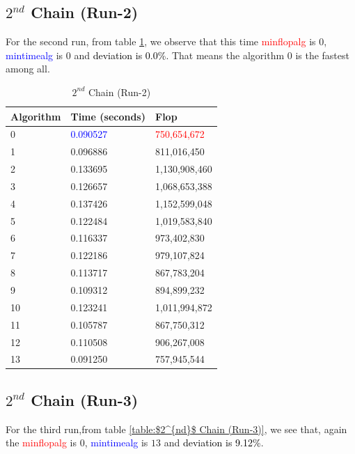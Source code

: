 \documentclass[10pts]{article}
\begin{document}
\subsection*{$2^{nd}$ Chain (Run-2)  }
For the second run, from table \ref{table:$2^{nd}$ Chain (Run-2)}, we observe that this time \textcolor{red}{min\textunderscore flop\textunderscore alg} is $0$, \textcolor{blue}{min\textunderscore time\textunderscore alg} is $0$ and  \textcolor{black}{deviation is 0.0\%}. That means the algorithm 0 is the fastest among all.  
\begin{table}[htp!]
	\centering
	\begin{center}
		
	\begin{tabular}{| l | l | l |}
		\hline
		\textbf{Algorithm}  & \textbf{Time} (seconds) & \textbf{Flop}\\
		\hline			
			0 &	\textcolor{blue}{0.090527} &	\textcolor{red}{750,654,672}\\ 		
			1 &	0.096886 &	811,016,450 \\		
			2 &	0.133695 &	1,130,908,460 	\\	
			3 &	0.126657 &	1,068,653,388 	\\
			4 &	0.137426 &	1,152,599,048 	\\	
			5 &	0.122484 &	1,019,583,840 	\\	
			6 &	0.116337 &	973,402,830 	\\	
			7 &	0.122186 &	979,107,824 	\\	
			8 &	0.113717 &	867,783,204 	\\	
			9 &	0.109312 &	894,899,232 	\\	
			10 &	0.123241& 	1,011,994,872\\ 		
			11 & 0.105787 	&867,750,312 		\\
			12 &	0.110508 &	906,267,008 	\\	
			13 &	0.091250 &	757,945,544  	\\	
			\hline
		\end{tabular}
	\end{center}
	\caption{$2^{nd}$ Chain (Run-2)}
	\label{table:$2^{nd}$ Chain (Run-2)}
\end{table}


\subsection*{$2^{nd}$ Chain (Run-3)  } 
For the third run,from table \ref{table:$2^{nd}$ Chain (Run-3)}, we see that, again the \textcolor{red}{min\textunderscore flop\textunderscore alg} is $0$, \textcolor{blue}{min\textunderscore time\textunderscore alg} is $13$ and  \textcolor{black}{deviation is 9.12\%}.
\end{document}
